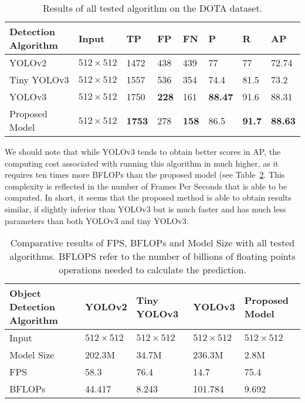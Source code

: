 \begin{table}[h!]
	\centering
	\begin{tabular}{@{}llllllll@{}}
		\toprule
		Detection Algorithm & Input            & TP   & FP  & FN  & P     & R    & AP    \\ \midrule
		YOLOv2              & $512 \times 512$ & 1472 & 438 & 439 & 77    & 77   & 72.74 \\
		Tiny YOLOv3         & $512 \times 512$ & 1557 & 536 & 354 & 74.4  & 81.5 & 73.2  \\
		YOLOv3              & $512 \times 512$ & 1750 & \textbf{228}& 161 & \textbf{88.47}& 91.6 & 88.31 \\
		Proposed Model      & $512 \times 512$ & \textbf{1753}& 278 & \textbf{158}& 86.5  & \textbf{91.7}& \textbf{88.63} \\ \bottomrule
	\end{tabular}
	\caption{Results of all tested algorithm on the DOTA dataset.}
	\label{tab:resSimpleDOTA}
\end{table}

We should note that while YOLOv3 tends to obtain better scores in AP, the computing cost associated with running this algorithm in much higher, as it requires ten times more BFLOPs than the proposed model (see Table~\ref{tab:perfSimple}. This complexity is reflected in the number of Frames Per Seconds that is able to be computed. In short, it seems that the proposed method is able to obtain results similar, if slightly inferior than YOLOv3 but is much faster and has much less parameters than both YOLOv3 and tiny YOLOv3.
\begin{table}[ht]
	\centering
	\begin{tabular}{@{}lllll@{}}
		\toprule
		Object Detection Algorithm & YOLOv2           & Tiny YOLOv3      & YOLOv3           & Proposed Model   \\ \midrule
		Input                      & $512 \times 512$ & $512 \times 512$ & $512 \times 512$ & $512 \times 512$ \\
		Model Size                 & 202.3M           & 34.7M            & 236.3M           & 2.8M             \\
		FPS                        & 58.3             & 76.4             & 14.7             & 75.4             \\
		BFLOPs                     & 44.417           & 8.243            & 101.784          & 9.692            \\ \bottomrule
	\end{tabular}
	\caption{Comparative results of FPS, BFLOPs and Model Size with all tested algorithms. BFLOPS refer to the number of billions of floating points operations needed to calculate the prediction.}
	\label{tab:perfSimple}
\end{table}
\clearpage
